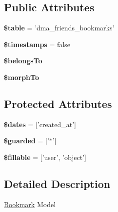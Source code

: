 \subsection*{Public Attributes}
\begin{DoxyCompactItemize}
\item 
\hypertarget{classDMA_1_1Friends_1_1Models_1_1Bookmark_a40fb0c28e22fca220841aa02fa4cd57a}{{\bfseries \$table} = 'dma\+\_\+friends\+\_\+bookmarks'}\label{classDMA_1_1Friends_1_1Models_1_1Bookmark_a40fb0c28e22fca220841aa02fa4cd57a}

\item 
\hypertarget{classDMA_1_1Friends_1_1Models_1_1Bookmark_a28f6465605a4b539097b029883c1ed34}{{\bfseries \$timestamps} = false}\label{classDMA_1_1Friends_1_1Models_1_1Bookmark_a28f6465605a4b539097b029883c1ed34}

\item 
{\bfseries \$belongs\+To}
\item 
{\bfseries \$morph\+To}
\end{DoxyCompactItemize}
\subsection*{Protected Attributes}
\begin{DoxyCompactItemize}
\item 
\hypertarget{classDMA_1_1Friends_1_1Models_1_1Bookmark_aec0930460944ef0645f1126f31af7e66}{{\bfseries \$dates} = \mbox{[}'created\+\_\+at'\mbox{]}}\label{classDMA_1_1Friends_1_1Models_1_1Bookmark_aec0930460944ef0645f1126f31af7e66}

\item 
\hypertarget{classDMA_1_1Friends_1_1Models_1_1Bookmark_a45353dd30557ec75a8ff23ef53c5831c}{{\bfseries \$guarded} = \mbox{[}'$\ast$'\mbox{]}}\label{classDMA_1_1Friends_1_1Models_1_1Bookmark_a45353dd30557ec75a8ff23ef53c5831c}

\item 
\hypertarget{classDMA_1_1Friends_1_1Models_1_1Bookmark_a752a22c8b38d6b802046797ea89fc007}{{\bfseries \$fillable} = \mbox{[}'user', 'object'\mbox{]}}\label{classDMA_1_1Friends_1_1Models_1_1Bookmark_a752a22c8b38d6b802046797ea89fc007}

\end{DoxyCompactItemize}


\subsection{Detailed Description}
\hyperlink{classDMA_1_1Friends_1_1Models_1_1Bookmark}{Bookmark} Model 

